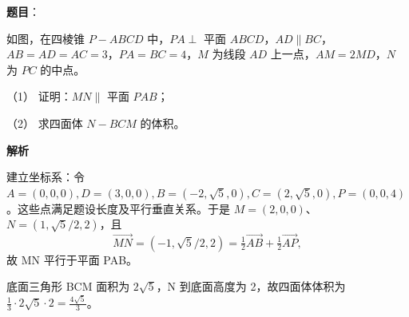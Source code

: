 \begin{answer}

\textbf{题目}：

如图，在四棱锥 \(P-ABCD\) 中，\(PA\perp\) 平面 \(ABCD\)，\(AD\parallel BC\)，\(AB=AD=AC=3\)，\(PA=BC=4\)，\(M\) 为线段 \(AD\) 上一点，\(AM=2MD\)，\(N\) 为 \(PC\) 的中点。
\nopagebreak[4]
\begin{center}\end{center}
\nopagebreak[4]
（1） 证明：\(MN\parallel\) 平面 \(PAB\)；

（2） 求四面体 \(N-BCM\) 的体积。


\textbf{解析}


建立坐标系：令 \(A=(0,0,0),D=(3,0,0),B=(-2,\sqrt5,0),C=(2,\sqrt5,0),P=(0,0,4)\)。这些点满足题设长度及平行垂直关系。于是 \(M=(2,0,0)\)、\(N=(1,\sqrt5/2,2)\)，且
\nopagebreak[4]
\[
\overrightarrow{MN}=(-1,\sqrt5/2,2)=\tfrac12\overrightarrow{AB}+\tfrac12\overrightarrow{AP},
\]
故 MN 平行于平面 PAB。


底面三角形 BCM 面积为 \(2\sqrt5\)，N 到底面高度为 2，故四面体体积为 \(\frac13\cdot2\sqrt5\cdot2=\frac{4\sqrt5}{3}\)。



\end{answer}
